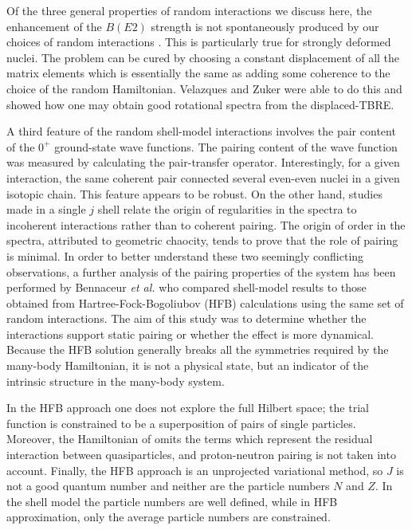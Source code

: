 \documentclass[preprint,rmp,aps,floatfix]{revtex4}
\begin{document}
Of the three general properties of random interactions we discuss here, 
the enhancement of the $B(E2)$ strength is not spontaneously produced by
our choices of random interactions \cite{horoi01}. This is particularly
true for strongly deformed nuclei. 
The problem can be cured \cite{vz02} by
choosing a constant displacement of all the matrix elements which is 
essentially the same as adding some coherence to the choice of the random
Hamiltonian. Velazques and Zuker \cite{vz02} were able to do this and 
showed how one may obtain good rotational spectra from the displaced-TBRE. 

A third feature of the random shell-model interactions involves the pair 
content of the $0^+$ ground-state wave functions. The pairing content of
the wave function was measured by calculating the pair-transfer operator. 
Interestingly, for a given interaction, the same coherent pair connected
several even-even nuclei in a given isotopic chain. This feature appears
to be robust.  On the other hand, studies \cite{mulhall00} 
made in a single $j$ shell relate the origin of regularities in 
the spectra to incoherent interactions
rather than to coherent pairing. The origin of order in the spectra,
attributed to geometric chaocity,
tends to prove that the role of pairing is minimal.
In order to better understand these two seemingly conflicting
observations, a further analysis of the pairing properties of 
the system has been performed by Bennaceur {\em et al.} \cite{ben02}
who compared shell-model results to those obtained 
from Hartree-Fock-Bogoliubov (HFB) calculations using the same set of
random interactions. 
The aim of this study was to determine whether
the interactions support static pairing or whether the effect is 
more dynamical.  Because the HFB solution generally breaks all the 
symmetries required by the many-body Hamiltonian, it is not a 
physical state, but an indicator of the intrinsic structure in 
the many-body system.  

In the HFB approach
one does not explore the full Hilbert space; the trial function
is constrained to be a superposition of pairs of single particles.
Moreover, the Hamiltonian of \cite{ben02} omits
the terms which represent the residual interaction between quasiparticles, 
and proton-neutron pairing is not taken into account.
Finally, the HFB approach is an unprojected
variational method, so $J$ is not a good quantum number
and neither are the particle numbers $N$ and $Z$.
In the shell model the particle numbers are well defined, while in HFB
approximation, only the average particle numbers are constrained.
\end{document}
